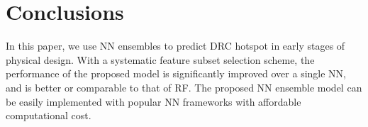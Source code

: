 \documentclass[10pt, final, letter, twocolumns]{IEEEtran}
\begin{document}
\vspace{-1mm}
\section{Conclusions}
\label{sec:conclusions}
In this paper, we use NN ensembles to predict DRC hotspot in early stages of physical design. With a systematic feature subset selection scheme, the performance of the proposed model is significantly improved over a single NN, and is better or comparable to that of RF. The proposed NN ensemble model can be easily implemented with popular NN frameworks with affordable computational cost. 




\scriptsize


%

\end{document}

